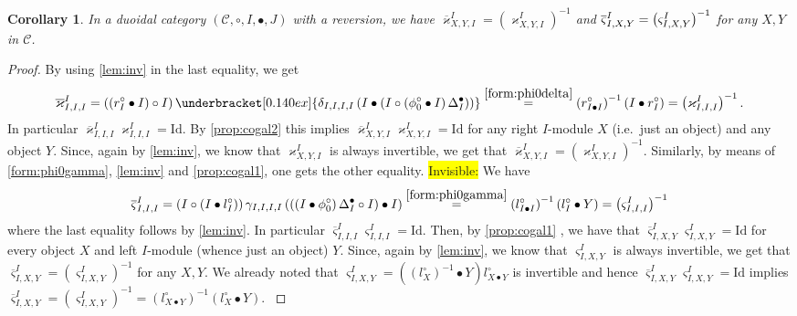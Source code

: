 \documentclass[nosumlimits,twoside]{amsart}
\newtheorem{corollary}[corollary]{\sc Corollary}
\theoremstyle{definition}
\theoremstyle{remark}
\newenvironment{invisible}{{\noindent\sc \colorbox{yellow}{Invisible:}\;}\color{gray}}{\medskip}
\newcommand{\rd}[1]{{\color{red}{#1}}}
\newcommand{\Cc}{\mathcal{C}}
\begin{document}
\begin{corollary}%
\label{coro:cogal1}
In a duoidal category $\left( \mathcal{C},\circ
,I,\bullet ,J\right) $  with a reversion, we have $\overline{\varkappa }%
_{X,Y,I}^{I}=\left( \varkappa _{X,Y,I}^{I}\right) ^{-1}$ and $\overline{%
\varsigma }_{I,X,Y}^{I}=\left( \varsigma _{I,X,Y}^{I}\right) ^{-1}$ for any $%
X,Y$ in $\Cc$.
\end{corollary}

\begin{proof}
By using \cref{lem:inv} in the last
equality, we get
\[\overline{\varkappa }_{I,I,I}^{I}=\left( \left( r_{I}^{\circ }\bullet
I\right) \circ I\right) \underbracket[0.140ex]{\delta _{I,I,I,I}\left( I\bullet \left( I\circ
\left( \phi^\circ _{0}\bullet I\right) \Delta _{I}^{\bullet }\right) \right)}
\overset{\eqref{form:phi0delta}}=\left( r_{I\bullet I}^{\circ }\right) ^{-1}\left( I\bullet r_{I}^{\circ
}\right) =\left( \varkappa _{I,I,I}^{I}\right) ^{-1}.\]
In particular $\overline{\varkappa }%
_{I,I,I}^{I}\varkappa _{I,I,I}^{I}=\mathrm{Id.}$ By \cref{prop:cogal2} this
implies $\overline{\varkappa }_{X,Y,I}^{I}\varkappa _{X,Y,I}^{I}=\mathrm{Id}$
for any right $I$-module $X$ (i.e.\ just an object) and any object $Y.$ 
Since, again by \cref{lem:inv}, we know that $\varkappa _{X,Y,I}^{I}$ is always
invertible, we get that $\overline{\varkappa }_{X,Y,I}^{I}=\left( \varkappa
_{X,Y,I}^{I}\right) ^{-1}$. Similarly, by means of \eqref{form:phi0gamma}, \cref{lem:inv} and \cref{prop:cogal1}, one gets the other equality.
\begin{invisible}
   We have
\[\overline{\varsigma }_{I,I,I}^{I}=\left( I\circ \left( I\bullet
l_{I}^{\circ }\right) \right) \gamma _{I,I,I,I}\left( \left( \left( I\bullet
\phi^\circ _{0}\right) \Delta _{I}^{\bullet }\circ I\right) \bullet I\right)
\overset{\eqref{form:phi0gamma}}=\left( l_{I\bullet I}^{\circ }\right) ^{-1}\left( l_{I}^{\circ }\bullet
Y\right) =\left( \varsigma _{I,I,I}^{I}\right) ^{-1}\] 
where the last
equality follows by \cref{lem:inv}. In particular $\overline{\varsigma }%
_{I,I,I}^{I}\varsigma _{I,I,I}^{I}=\mathrm{Id.}$ Then, by \cref{prop:cogal1}%
, we have that $\overline{\varsigma }_{I,X,Y}^{I}\varsigma _{I,X,Y}^{I}=%
\mathrm{Id}$ for every object $X$ and left $I$-module (whence just an
object) $Y.$ Since, again by \cref{lem:inv}, we know that $\varsigma _{I,X,Y}^{I}$
is always invertible, we get that $\overline{\varsigma }_{I,X,Y}^{I}=\left(
\varsigma _{I,X,Y}^{I}\right) ^{-1}$ for any $X,Y.$ 
We already noted that
$\varsigma _{I,X,Y}^{I}=\left( \left( l_{X}^{\circ }\right) ^{-1}\bullet
Y\right) l_{X\bullet Y}^{\circ }$
is invertible and hence $\overline{\varsigma }_{I,X,Y}^{I}\varsigma
_{I,X,Y}^{I}=\mathrm{Id}$ implies $\overline{\varsigma }_{I,X,Y}^{I}=\left(
\varsigma _{I,X,Y}^{I}\right) ^{-1}=\left( l_{X\bullet Y}^{\circ }\right)
^{-1}\left( l_{X}^{\circ }\bullet Y\right) .$ 
\end{invisible}
\end{proof}
\end{document}
